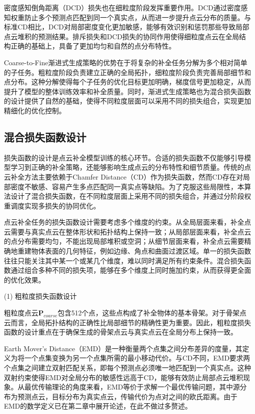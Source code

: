 密度感知倒角距离（DCD）损失也在细粒度阶段发挥重要作用。DCD通过密度感知权重防止多个预测点匹配到同一个真实点，从而进一步提升点云分布的质量。与标准CD相比，DCD对局部密度变化更加敏感，能够有效识别和惩罚那些导致局部点云堆积的预测结果。排斥损失和DCD损失的协同作用使得细粒度点云在全局结构正确的基础上，具备了更加均匀和自然的点分布特性。

Coarse-to-Fine渐进式生成策略的优势在于将复杂的补全任务分解为多个相对简单的子任务。粗粒度阶段负责建立正确的全局拓扑，细粒度阶段负责完善局部细节和点分布。这种分解使得每个子任务的优化目标更加明确，梯度信号更加稳定，从而提升了模型的整体训练效率和补全质量。同时，渐进式生成策略也为混合损失函数的设计提供了自然的基础，使得不同粒度层面可以采用不同的损失组合，实现更加精细化的优化控制。

\subsection{混合损失函数设计}

损失函数的设计是点云补全模型训练的核心环节。合适的损失函数不仅能够引导模型学习到正确的补全策略，还能够影响生成点云的分布特性和细节质量。传统的点云补全方法主要依赖于Chamfer Distance（CD）作为损失函数，然而CD存在对局部密度不敏感、容易产生多点匹配同一真实点等缺陷\cite{wu2021densityaware}。为了克服这些局限性，本算法设计了混合损失函数，在不同粒度层面上采用不同的损失组合，并通过分阶段权重调度实现多损失的协同优化。

点云补全任务的损失函数设计需要考虑多个维度的约束。从全局层面来看，补全点云需要与真实点云在整体形状和拓扑结构上保持一致；从局部层面来看，补全点云的点分布需要均匀，不能出现局部堆积或空洞；从细节层面来看，补全点云需要精确地重建物体表面的几何特征，例如边缘、角点和曲面过渡区域。单一的损失函数往往只能关注其中某一个或某几个维度，难以同时满足所有约束条件。混合损失函数通过组合多种不同的损失项，能够在多个维度上同时施加约束，从而获得更全面的优化效果。

(1) 粗粒度损失函数设计

粗粒度点云$\mathbf{P}_{coarse}$包含512个点，这些点构成了补全物体的基本骨架。对于骨架点云而言，全局拓扑结构的正确性比局部细节的精确性更为重要。因此，粗粒度损失函数的设计重点在于确保生成的骨架点云与真实点云在全局分布上保持一致。

Earth Mover's Distance（EMD）是一种衡量两个点集之间分布差异的度量，其定义为将一个点集变换为另一个点集所需的最小移动代价。与CD不同，EMD要求两个点集之间建立双射匹配关系，即每个预测点必须唯一地匹配到一个真实点。这种双射约束使得EMD对全局分布的敏感性远高于CD，能够有效防止局部点云堆积现象。从最优传输理论的角度来看，EMD等价于求解一个最优传输问题，其中源分布为预测点云，目标分布为真实点云，传输代价为点对之间的欧氏距离。由于EMD的数学定义已在第二章中展开论述，在此不做过多赘述。

